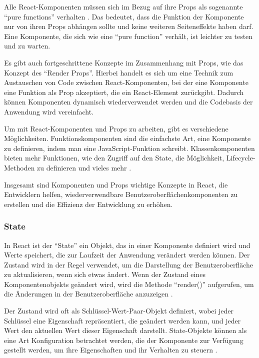 Alle React-Komponenten müssen sich im Bezug auf ihre Props als sogenannte "`pure functions"' verhalten \cite{ReactComponentsAndProps}. Das bedeutet, dass die Funktion der Komponente nur von ihren Props abhängen sollte und keine weiteren Seiteneffekte haben darf. Eine Komponente, die sich wie eine "`pure function"' verhält, ist leichter zu testen und zu warten.

Es gibt auch fortgeschrittene Konzepte im Zusammenhang mit Props, wie das Konzept des "`Render Props"'. Hierbei handelt es sich um eine Technik zum Austauschen von Code zwischen React-Komponenten, bei der eine Komponente eine Funktion als Prop akzeptiert, die ein React-Element zurückgibt. Dadurch können Komponenten dynamisch wiederverwendet werden und die Codebasis der Anwendung wird vereinfacht\cite{ReactRenderProps}.

Um mit React-Komponenten und Props zu arbeiten, gibt es verschiedene Möglichkeiten. Funktionskomponenten sind die einfachste Art, eine Komponente zu definieren, indem man eine JavaScript-Funktion schreibt. Klassenkomponenten bieten mehr Funktionen, wie den Zugriff auf den State, die Möglichkeit, Lifecycle-Methoden zu definieren und vieles mehr \cite{RunebookReactComponentsAndProps}.

Insgesamt sind Komponenten und Props wichtige Konzepte in React, die Entwicklern helfen, wiederverwendbare Benutzeroberflächenkomponenten zu erstellen und die Effizienz der Entwicklung zu erhöhen.

\subsubsection{State}

In React ist der "`State"' ein Objekt, das in einer Komponente definiert wird und Werte speichert, die zur Laufzeit der Anwendung verändert werden können. Der Zustand wird in der Regel verwendet, um die Darstellung der Benutzeroberfläche zu aktualisieren, wenn sich etwas ändert. Wenn der Zustand eines Komponentenobjekts geändert wird, wird die Methode "`render()"' aufgerufen, um die Änderungen in der Benutzeroberfläche anzuzeigen \cite{W3SchoolsReactState}.

Der Zustand wird oft als Schlüssel-Wert-Paar-Objekt definiert, wobei jeder Schlüssel eine Eigenschaft repräsentiert, die geändert werden kann, und jeder Wert den aktuellen Wert dieser Eigenschaft darstellt. State-Objekte können als eine Art Konfiguration betrachtet werden, die der Komponente zur Verfügung gestellt werden, um ihre Eigenschaften und ihr Verhalten zu steuern \cite{FreeCodeCampStateInReact}.

